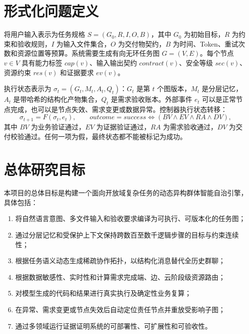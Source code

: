 \documentclass[UTF8,a4paper,12pt,oneside]{ctexbook}
\begin{document}
\section{形式化问题定义}
将用户输入表示为任务规格 $S=(G_0,R,I,O,B)$，其中 $G_0$ 为初始目标，$R$ 为约束和验收规则，$I$ 为输入文件集合，$O$ 为交付物契约，$B$ 为时间、Token、重试次数和资源位置等预算。系统需要生成有向无环任务图 $G=(V,E)$。每个节点 $v\in V$ 具有能力标签 $cap(v)$、输入输出契约 $contract(v)$、安全等级 $sec(v)$、资源约束 $res(v)$ 和证据要求 $ev(v)$。

执行状态表示为 $\sigma_t=(G_t,M_t,A_t,Q_t)$：$G_t$ 是第 $t$ 个图版本，$M_t$ 是分层记忆，$A_t$ 是带哈希的结构化产物集合，$Q_t$ 是需求验收账本。外部事件 $e_t$ 可以是正常节点完成，也可以是节点失效、需求变更或数据异常。控制器执行状态转移：
\[
\sigma_{t+1}=F(\sigma_t,e_t),\qquad
outcome=success\Leftrightarrow(BV\land EV\land RA\land DV),
\]
其中 $BV$ 为业务验证通过，$EV$ 为证据验证通过，$RA$ 为需求验收通过，$DV$ 为交付校验通过。任何一项为假，最终状态都不能被标记为成功。

\section{总体研究目标}
本项目的总体目标是构建一个面向开放域复杂任务的动态异构群体智能自治引擎，具体包括：
\begin{enumerate}
\item 将自然语言意图、多文件输入和验收要求编译为可执行、可版本化的任务图；
\item 通过分层记忆和受保护上下文保持跨数百至数千逻辑步骤的目标与约束连续性；
\item 根据任务语义动态生成稀疏协作拓扑，以结构化消息替代全历史群聊；
\item 根据数据敏感性、实时性和计算需求完成端、边、云阶段级资源路由；
\item 对模型生成的代码和结果进行真实执行及确定性业务复算；
\item 在异常、需求变更或节点失效后自动定位责任节点并重放受影响子图；
\item 通过多领域运行证据证明系统的可部署性、可扩展性和可验收性。
\end{enumerate}
\end{document}
